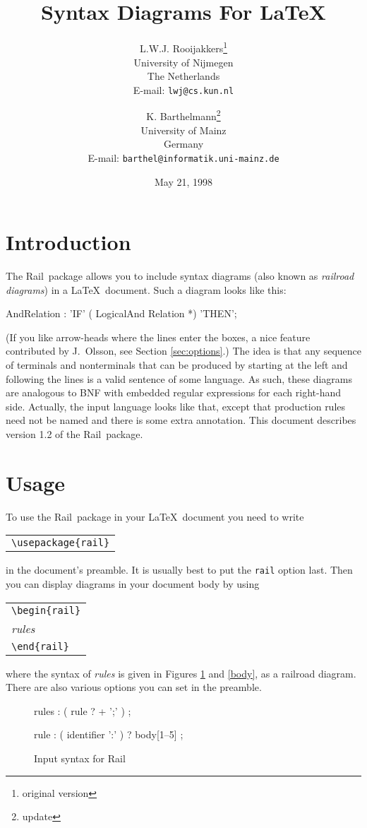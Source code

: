\documentclass[a4paper]{article}
\title{
\Rail \\[1ex]
Syntax Diagrams For \LaTeX
}
\author{
   L.W.J. Rooijakkers\thanks{original version}
\\ University of Nijmegen
\\ The Netherlands
\\ E-mail: \texttt{lwj@cs.kun.nl}
\and
   K. Barthelmann\thanks{update}
\\ University of Mainz
\\ Germany
\\ E-mail: \texttt{barthel@informatik.uni-mainz.de}
}
\date{May 21, 1998}
\newcommand\Rail{Rail}
\newcommand\nt[1]{\textit{#1}}
\newcommand\lit[1]{\texttt{#1}}
\newenvironment{example}%
{\begin{trivlist}\item[]\begin{tabular}{l}}%
{\end{tabular}\end{trivlist}}
\begin{document}
\maketitle

\section{Introduction}

The \Rail\ package allows you to include syntax diagrams (also known as
\emph{railroad diagrams}) in a \LaTeX\ document. Such a diagram looks
like this:
\label{example}
\begin{rail}

AndRelation : 'IF' ( LogicalAnd Relation *) 'THEN';

\end{rail}
(If you like arrow-heads where the lines enter the boxes, a nice feature
contributed by J.~Olsson, see Section \ref{sec:options}.)
The idea is that any sequence of terminals and nonterminals that can be
produced by starting at the left and following the lines is a valid sentence
of some language. As such, these diagrams are analogous to BNF with embedded
regular expressions for each right-hand side. Actually, the input
language looks like that, except that production rules need not be named
and there is some extra annotation. This document describes version 1.2
of the \Rail\ package.

\section{Usage}

To use the \Rail\ package in your \LaTeX\ document you need to write
\begin{example}
\verb!\usepackage{rail}!
\end{example}
in the document's preamble.
It is usually best to put the \lit{rail} option last. Then you can
display diagrams in your document body by using
\begin{example}
\verb!\begin{rail}! \\
\nt{rules} \\
\verb!\end{rail}!
\end{example}
where the syntax of \nt{rules} is given in Figures \ref{rules} and
\ref{body}, as a railroad diagram. There are also various options
you can set in the preamble.

\begin{figure}
\begin{rail}

rules	: ( rule ? + ';' ) ;

rule	: ( identifier ':' ) ? body[1--5] ;

\end{rail}
\caption{Input syntax for \Rail}
\label{rules}
\end{figure}
\end{document}
